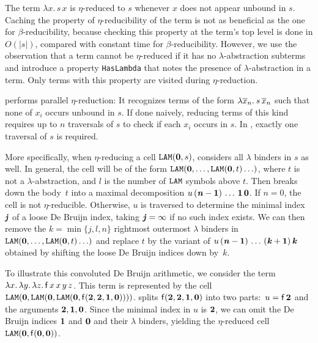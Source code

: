 The term $\lambda x.\, s \, x$ is $\eta$-reduced to $s$ whenever $x$ does not appear
unbound in $s$. Caching the property of $\eta$-reducibility of the term is not
as beneficial as the one for $\beta$-reducibility, because checking this
property at the term's top level is done in $O(|s|)$, compared with constant time
for $\beta$-reducibility.
However, we use the observation that a term cannot be $\eta$-reduced if it has
no $\lambda$-abstraction subterms and introduce a property \texttt{HasLambda}
that notes the presence of $\lambda$-abstraction in a term. Only
terms with this property are visited during $\eta$-reduction.

\ehohii{} performs parallel $\eta$-reduction: It recognizes terms of the form
$\lambda \overline{x}_n.\> s \, \overline{x}_n  $ such that none of $x_i$
occurs unbound in $s$. If done naively, reducing terms of this kind requires up to $n$
traversals of $s$ to check if each $x_i$ occurs in $s$. In \ehohii{}, exactly one
traversal of $s$ is required.

More specifically, when $\eta$-reducing a cell $\texttt{LAM}(\mathbf{0}, s)$,
\ehohii{} considers all $\lambda$ binders in $s$ as well. In general,
the cell will be of the form
$\texttt{LAM}(\mathbf{0}, \dotsc,\allowbreak \texttt{LAM}(\mathbf{0}, t) \ldots)$,
where $t$ is not a
$\lambda$-abstraction, and $l$ is the number of $\texttt{LAM}$ symbols above $t$. Then \ehohii{} breaks down the body~$t$ into a maximal
decomposition $u\, (\textbf{\textit{n}}\mathbf{{}-1}) \, \ldots \, \mathbf{1} \, \mathbf{0}$.
If $n = 0$, the cell is not $\eta$-reducible.
Otherwise, $u$ is traversed to determine the
minimal index~$\textbf{\textit{j}}$ of a loose De Bruijn index,
taking $\textbf{\textit{j}} = \infty$ if no such index exists.
We can then remove the $k = \min\{j,l,n\}$ rightmost outermost $\lambda$ binders in $\texttt{LAM}(\mathbf{0},
\ldots, \texttt{LAM}(\mathbf{0}, t) \ldots)$ and replace %
$t$ by the variant of
$u \allowbreak\, (\textbf{\textit{n}}\mathbf{{}-1}) \allowbreak\, \ldots \, (\textbf{\textit{k}}\mathbf{{}+1}) \, \textbf{\textit{k}}$
obtained by shifting the loose De Bruijn indices down by~$k$.

To illustrate this convoluted De Bruijn arithmetic, we consider the
term $\lambda x. \, \lambda y. \, \lambda z.\, \mathsf{f} \, x \, x \, y
\, z$. This term is represented by the cell $\texttt{LAM}(\mathbf{0},
\texttt{LAM}(\mathbf{0}, \texttt{LAM}(\mathbf{0},\allowbreak \mathsf{f}(\mathbf{2}, \mathbf{2}, \mathbf{1},
\mathbf{0}))))$. \ehohii{} splits $\mathsf{f}(\mathbf{2}, \mathbf{2}, \mathbf{1}, \mathbf{0})$ into
two parts:\ $u = \mathsf{f} \, \mathbf{2}$ and the arguments $\mathbf{2}, \mathbf{1},
\mathbf{0}$. Since the minimal index in $u$ is $\mathbf{2}$, we can
omit the De Bruijn indices $\mathbf{1}$ and $\mathbf{0}$ and their $\lambda$ binders,
yielding the $\eta$-reduced cell $\texttt{LAM}(\mathbf{0}, \mathsf{f}(\mathbf{0},
\mathbf{0}))$.

